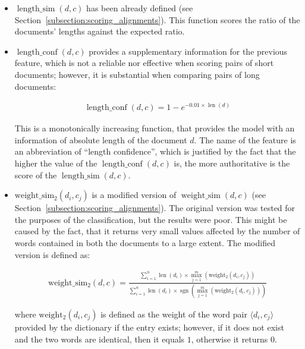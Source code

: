 \begin{itemize}
	\item $\operatorname{length\_sim}(d, c)$ has been already defined (see Section~\ref{subsection:scoring_alignments}). This function scores the ratio of the documents' lengths against the expected ratio.

	\item $\operatorname{length\_conf}(d, c)$ provides a supplementary information for the previous feature, which is not a reliable nor effective when scoring pairs of short documents; however, it is substantial when comparing pairs of long documents:
		
	\begin{align*}
	\operatorname{length\_conf}(d, c)=1 - e^{-0.01 \times \operatorname{len}(d)}
	\end{align*}
		
	This is a monotonically increasing function, that provides the model with an information of absolute length of the document $d$. The name of the feature is an abbreviation of ``length confidence'', which is justified by the fact that the higher the value of the $\operatorname{length\_conf}(d, c)$ is, the more authoritative is the score of the $\operatorname{length\_sim}(d, c)$.
		
	\item $\operatorname{weight\_sim_2}(d_i, c_j)$ is a modified version of $\operatorname{weight\_sim}(d, c)$ (see Section~\ref{subsection:scoring_alignments}). The original version was tested for the purposes of the classification, but the results were poor. This might be caused by the fact, that it returns very small values affected by the number of words contained in both the documents to a large extent. The modified version is defined as:

	\begin{align*}
	\operatorname{weight\_sim_2}(d, c)=\frac{\sum\limits_{i=1}^{n} \operatorname{len}(d_i) \times \max\limits_{j=1}^{m}\left(\operatorname{weight_2}(d_i, c_j)\right)}{\sum\limits_{i=1}^{n} \operatorname{len}(d_i) \times \operatorname{sgn}(\max\limits_{j=1}^{m}\left(\operatorname{weight_2}(d_i, c_j)\right))}
	\end{align*}
		
	where $\operatorname{weight_2}(d_i, c_j)$ is defined as the weight of the word pair $\langle d_i,c_j \rangle$ provided by the dictionary if the entry exists; however, if it does not exist and the two words are identical, then it equals $1$, otherwise it returns $0$.
		

\end{itemize}
